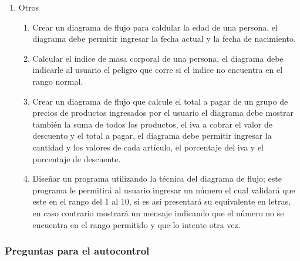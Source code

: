 \documentclass[a4paper,12pt,spanish]{article}
\begin{document}
\begin{enumerate}
\item Otros
  \begin{enumerate}
  \item Crear un diagrama de flujo para caldular la edad de una persona, el diagrama debe permitir ingresar la fecha actual y la fecha de nacimiento.
  \item Calcular el indice de masa corporal de una persona, el diagrama debe indicarle al usuario el peligro que corre si el indice no  encuentra en el rango normal.
  \item Crear un diagrama de flujo que calcule el total  a pagar de un grupo de precios de productos ingresados por el usuario el diagrama debe mostrar también la suma de todos los productos, el iva a cobrar el valor de descuento y el total a pagar, el diagrama debe permitir ingresar la cantidad y los valores de cada artículo, el porcentaje del iva y el porcentaje de descuente.
  \item Diseñar un programa utilizando la técnica del diagrama de flujo; este programa  le permitirá al usuario ingresar un número el cual validará que este en el rango del 1 al 10, si es así presentará su equivalente en letras, en caso contrario mostrará un mensaje indicando que el número no se encuentra en el rango permitido y que lo intente otra vez.
  \end{enumerate}

  
  
\end{enumerate}





\newpage

\subsubsection{Preguntas para el autocontrol}
\label{sec:preguntas-para-el-2}
\end{document}
